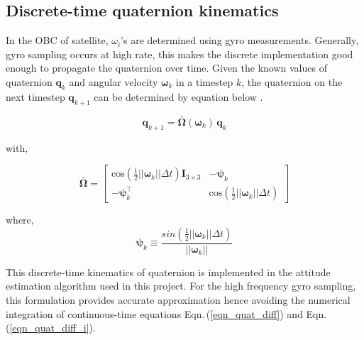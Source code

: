 \documentclass[12pt]{article}
\begin{document}

    

\subsection{Discrete-time quaternion kinematics}
In the OBC of satellite, $\omega_{i}$'s are determined using gyro measurements. Generally, gyro sampling occurs at high rate, this makes the discrete implementation good enough to propagate the quaternion over time. Given the known values of quaternion $\bm{q}_{k}$ and angular velocity $\bm{\omega}_{k}$ in a timestep $k$, the quaternion on the next timestep $\bm{q}_{k+1}$ can be determined by equation below \cite{crassidis2011}.

\begin{equation}
    \bm{q}_{k+1} = \bar{\bm{\Omega}}(\bm{\omega}_{k}) \, \bm{q}_{k}
\end{equation}

with,

\begin{equation*}
    \bar{\bm{\Omega}} =
    \begin{bmatrix}
        \text{cos}\left( \frac{1}{2} |\!| \bm{\omega}_{k} |\!| \Delta t \right) \bm{I}_{3\times3} & - \bm{\psi}_{k} \\
        - \bm{\psi}_{k}^{\intercal} & \text{cos}\left( \frac{1}{2} |\!|\bm{\omega}_{k}|\!| \Delta t \right)
    \end{bmatrix}
\end{equation*}

where,
\begin{equation}
\bm{\psi}_{k} \equiv \frac{sin\left( \frac{1}{2} |\!| \bm{\omega}_{k} |\!| \Delta t \right)}{|\!| \bm{\omega}_{k} |\!|}
\end{equation}

This discrete-time kinematics of quaternion is implemented in the attitude estimation algorithm used in this project. For the high frequency gyro sampling, this formulation provides accurate approximation hence avoiding the numerical integration of continuous-time equations Eqn.\,(\ref{eqn_quat_diff}) and Eqn.\,(\ref{eqn_quat_diff_i}).
\end{document}
